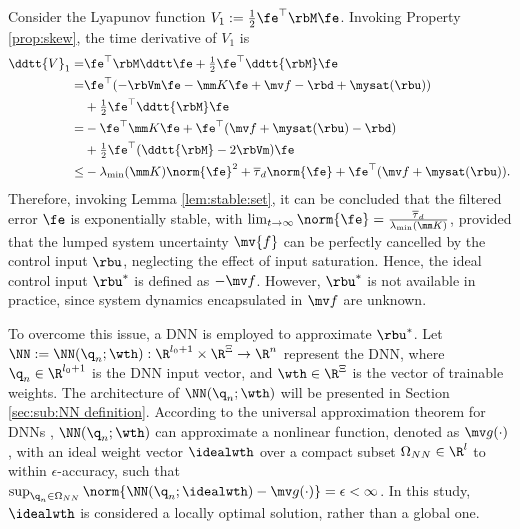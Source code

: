 \documentclass[lettersize,journal]{IEEEtran}
\begin{document}
Consider the Lyapunov function $V_1:= \tfrac{1}{2}\fe^\top \rbM\fe$. 
Invoking Property \ref{prop:skew}, the time derivative of $V_1$ is
\begin{equation}
    \begin{aligned}
        \ddtt{V}_1
        =&
        \fe^\top \rbM \ddtt \fe
        +
        \tfrac{1}{2}\fe^\top \ddtt{\rbM}\fe
        \\
        =&
        \fe^\top (
            -\rbVm \fe -\mm K \fe + \mv f
            -\rbd + \mysat(\rbu)
        )
        \\
        &
        +
        \tfrac{1}{2}
        \fe^\top \ddtt{\rbM}\fe
        \\
        =&
        -
        \fe^\top \mm K \fe 
        +
        \fe^\top (
            \mv f+\mysat(\rbu)
            -\rbd
        )
        \\
        &
        +
        \tfrac{1}{2}
        \fe^\top(\ddtt{\rbM}- 2\rbVm)\fe
        \\
        \le&
        -\lambda_{\min}(\mm K)\norm{\fe}^2
        +
        \overline\tau_d\norm{\fe}
        +
        \fe^\top (\mv f+\mysat(\rbu))
        .
    \end{aligned}
    \label{eq:lya1:dot1}
\end{equation} 
Therefore, invoking Lemma \ref{lem:stable:set}, it can be concluded that the filtered error $\fe$ is exponentially stable, with $\lim_{t\to\infty}\norm{\fe}=\tfrac{\overline\tau_d}{\lambda_{\min}(\mm K)}$, provided that the lumped system uncertainty $\mv{f}$ can be perfectly cancelled by the control input $\rbu$, neglecting the effect of input saturation.
Hence, the ideal control input $\rbu^*$ is defined as $-\mv f$.
However, $\rbu^*$ is not available in practice, since system dynamics encapsulated in $\mv f$ are unknown.

To overcome this issue, a DNN is employed to approximate $\rbu^*$.
Let $\NN:=\NN({\q}_n;\wth): \R^{l_0+1}\times\R^{\Xi}\to\R^{n}$ represent the DNN, where ${\q}_n\in\R^{l_0+1}$ is the DNN input vector, and $\wth\in\R^{\Xi}$ is the vector of trainable weights.
The architecture of $\NN({\q}_n;\wth)$ will be presented in Section \ref{sec:sub:NN definition}.
According to the universal approximation theorem for DNNs \cite{Kidger:2020aa}, $\NN({\q}_n;\wth)$ can approximate a nonlinear function, denoted as $\mv g(\cdot)$, with an ideal weight vector $\idealwth$ over a compact subset $\Omega_{NN}\in\R^{l}$ to within $\epsilon$-accuracy, such that $\sup_{{\q}_n\in\Omega_{NN}}\norm{ \NN({\q}_n;\idealwth) - \mv g(\cdot)} = \epsilon < \infty$.
In this study, $\idealwth$ is considered a locally optimal solution, rather than a global one.
\end{document}
